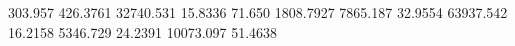 303.957   426.3761  %
32740.531 15.8336   %
71.650    1808.7927 %
7865.187  32.9554   %
63937.542 16.2158   %
5346.729  24.2391   %
10073.097 51.4638   %


